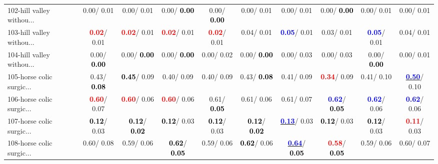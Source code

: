 \begin{table}[h]
\begin{center}
{\begin{tabular}{lc|c|c|c|c|c|c|c|c}
102-hill valley withou... &   0.00/  0.01 &   0.00/  0.01 &   0.00/\textcolor{black}{\textbf{  0.00}} &   0.00/\textcolor{black}{\textbf{  0.00}} &   0.00/  0.01 &   0.00/  0.01 &   0.00/\textcolor{black}{\textbf{  0.00}} &   0.00/  0.01 &   0.00/  0.01 \\
103-hill valley withou... & \textcolor{red}{\textbf{  0.02}}/  0.01 & \textcolor{red}{\textbf{  0.02}}/  0.01 & \textcolor{red}{\textbf{  0.02}}/  0.01 & \textcolor{red}{\textbf{  0.02}}/  0.01 &   0.04/  0.01 & \textcolor{blue}{\textbf{  0.05}}/  0.01 &   0.03/  0.01 & \textcolor{blue}{\textbf{  0.05}}/  0.01 &   0.04/  0.01 \\ \hline
104-hill valley withou... &   0.00/\textcolor{black}{\textbf{  0.00}} &   0.00/\textcolor{black}{\textbf{  0.00}} &   0.00/\textcolor{black}{\textbf{  0.00}} &   0.00/  0.02 &   0.00/\textcolor{black}{\textbf{  0.00}} &   0.00/  0.03 &   0.00/  0.03 &   0.00/\textcolor{black}{\textbf{  0.00}} &   0.00/  0.01 \\
105-horse colic surgic... &   0.43/\textcolor{black}{\textbf{  0.08}} & \textcolor{black}{\textbf{  0.45}}/  0.09 &   0.40/  0.09 &   0.40/  0.09 &   0.43/\textcolor{black}{\textbf{  0.08}} &   0.41/  0.09 & \textcolor{red}{\textbf{  0.34}}/  0.09 &   0.41/  0.10 & \underline{\textcolor{blue}{\textbf{  0.50}}}/  0.10 \\
106-horse colic surgic... & \textcolor{red}{\textbf{  0.60}}/  0.07 & \textcolor{red}{\textbf{  0.60}}/  0.06 & \textcolor{red}{\textbf{  0.60}}/  0.06 &   0.61/\textcolor{black}{\textbf{  0.05}} &   0.61/  0.06 &   0.61/  0.07 & \textcolor{blue}{\textbf{  0.62}}/\textcolor{black}{\textbf{  0.05}} & \textcolor{blue}{\textbf{  0.62}}/  0.06 & \textcolor{blue}{\textbf{  0.62}}/  0.06 \\
107-horse colic surgic... & \textcolor{black}{\textbf{  0.12}}/  0.03 & \textcolor{black}{\textbf{  0.12}}/\textcolor{black}{\textbf{  0.02}} & \textcolor{black}{\textbf{  0.12}}/  0.03 & \textcolor{black}{\textbf{  0.12}}/  0.03 & \textcolor{black}{\textbf{  0.12}}/\textcolor{black}{\textbf{  0.02}} & \underline{\textcolor{blue}{\textbf{  0.13}}}/  0.03 & \textcolor{black}{\textbf{  0.12}}/  0.03 & \textcolor{black}{\textbf{  0.12}}/  0.03 & \textcolor{red}{\textbf{  0.11}}/  0.03 \\
108-horse colic surgic... &   0.60/  0.08 &   0.59/  0.06 & \textcolor{black}{\textbf{  0.62}}/\textcolor{black}{\textbf{  0.05}} &   0.59/  0.06 & \textcolor{black}{\textbf{  0.62}}/  0.06 & \underline{\textcolor{blue}{\textbf{  0.64}}}/\textcolor{black}{\textbf{  0.05}} & \textcolor{red}{\textbf{  0.58}}/\textcolor{black}{\textbf{  0.05}} &   0.59/  0.06 &   0.60/  0.07 \\

\end{tabular}}
\end{center}
\end{table}
